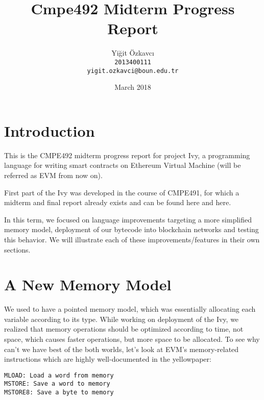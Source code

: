 \documentclass{article}
\title{Cmpe492 Midterm Progress Report}
\author{
  Yiğit Özkavcı \\
  \texttt{2013400111} \\
  \texttt{yigit.ozkavci@boun.edu.tr}
}
\date{March 2018}
\begin{document}

\maketitle

\tableofcontents

\newpage

\section{Introduction}
\par 
\par This is the CMPE492 midterm progress report for project Ivy, a programming language for writing smart contracts on Ethereum Virtual Machine (will be referred as EVM from now on).
\par First part of the Ivy was developed in the course of CMPE491, for which a midterm and final report already exists and can be found here\cite{CMPE491mtreport} and here\cite{CMPE491finalreport}.

In this term, we focused on language improvements targeting a more simplified memory model, deployment of our bytecode into blockchain networks and testing this behavior. We will illustrate each of these improvements/features in their own sections.

\section{A New Memory Model}
We used to have a pointed memory model, which was essentially allocating each variable according to its type. While working on deployment of the Ivy, we realized that memory operations should be optimized according to time, not space, which causes faster operations, but more space to be allocated. To see why can't we have best of the both worlds, let's look at EVM's memory-related instructions which are highly well-documented in the yellowpaper\cite{yellowpaper}:
\begin{lstlisting}
MLOAD: Load a word from memory
MSTORE: Save a word to memory
MSTORE8: Save a byte to memory
\end{lstlisting}
\end{document}
